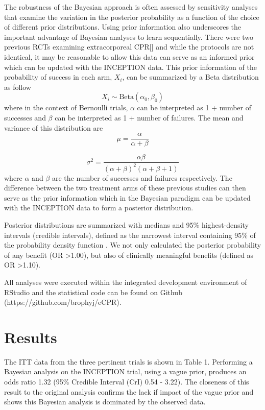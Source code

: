\documentclass[
  super,
  preprint,
  3p]{elsarticle}
\begin{document}
The robustness of the Bayesian approach is often assessed by sensitivity
analyses that examine the variation in the posterior probability as a
function of the choice of different prior distributions. Using prior
information also underscores the important advantage of Bayesian
analyses to learn sequentially. There were two previous RCTs examining
extracorporeal CPR{[}\citet{RN6759}{]}\citep{RN6751} and while the
protocols are not identical, it may be reasonable to allow this data can
serve as an informed prior which can be updated with the INCEPTION data.
This prior information of the probability of success in each arm,
\(X_i\), can be summarized by a Beta distribution as follow
\[X_i\sim\mbox{Beta}(\alpha_0,\beta_0)\] where in the context of
Bernoulli trials, \(\alpha\) can be interpreted as 1 + number of
successes and \(\beta\) can be interpreted as 1 + number of failures.
The mean and variance of this distribution are
\[\mu=\frac{\alpha}{\alpha+\beta}\]

\[\sigma^2=\frac{\alpha\beta}{(\alpha+\beta)^2(\alpha+\beta+1)}\] where
\(\alpha\) and \(\beta\) are the number of successes and failures
respectively. The difference between the two treatment arms of these
previous studies can then serve as the prior information which in the
Bayesian paradigm can be updated with the INCEPTION data to form a
posterior distribution.

Posterior distributions are summarized with medians and 95\%
highest-density intervals (credible intervals), defined as the narrowest
interval containing 95\% of the probability density function
\citep{mcelreath2020}. We not only calculated the posterior probability
of any benefit (OR \textgreater1.00), but also of clinically meaningful
benefits (defined as OR \textgreater1.10).

All analyses were executed within the integrated development environment
of RStudio and the statistical code can be found on Github
(https://github.com/brophyj/eCPR).

\hypertarget{results}{%
\section{Results}\label{results}}

The ITT data from the three pertinent trials is shown in Table 1.
Performing a Bayesian analysis on the INCEPTION trial, using a vague
prior, produces an odds ratio 1.32 (95\% Credible Interval (CrI) 0.54 -
3.22). The closeness of this result to the original analysis confirms
the lack if impact of the vague prior and shows this Bayesian analysis
is dominated by the observed data.
\end{document}
